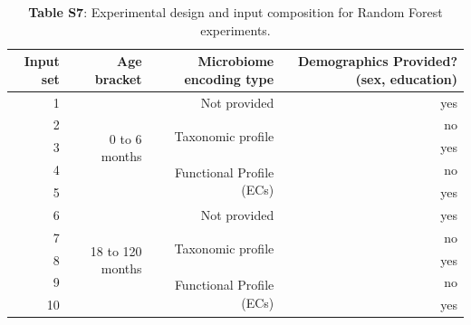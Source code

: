 \documentclass{article}
\begin{document}
\begin{table}[h]
  \begin{centering}
    \begin{tabular}{|r|r|r|r|}
      \hline\hline
      \textbf{Input set} & \textbf{Age bracket} & \textbf{Microbiome encoding type} & \textbf{Demographics Provided? (sex, education)} \\\hline
      1 & \multirow{5}{*}{0 to 6 months} & Not provided & yes \\ \cline{3-4}
      2 &  & \multirow{2}{*}{Taxonomic profile} & no \\ \cline{4-4}
      3 &  &  & yes \\ \cline{3-4}
      4 &  & \multirow{2}{*}{Functional Profile (ECs)} & no \\ \cline{4-4}
      5 &  &  & yes \\ \cline{2-4}
      6 & \multirow{5}{*}{18 to 120 months} & Not provided & yes \\ \cline{3-4}
      7 &  & \multirow{2}{*}{Taxonomic profile} & no \\ \cline{4-4}
      8 &  &  & yes \\ \cline{3-4}
      9 &  & \multirow{2}{*}{Functional Profile (ECs)} & no \\ \cline{4-4}
      10 &  &  & yes \\\hline\hline
    \end{tabular}
    \caption*{
      \textbf{Table S7}: Experimental design and input composition for Random
      Forest experiments.
    }
  \end{centering}
\end{table}
\end{document}
